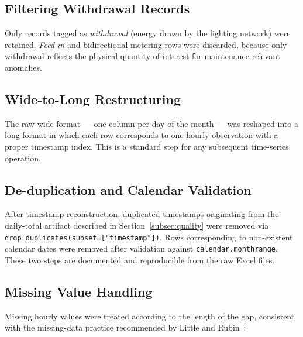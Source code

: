 \documentclass[11pt]{article}
\begin{document}
\subsection{Filtering Withdrawal Records}
Only records tagged as \emph{withdrawal} (energy drawn by the lighting network) were retained. \emph{Feed-in} and bidirectional-metering rows were discarded, because only withdrawal reflects the physical quantity of interest for maintenance-relevant anomalies.

\subsection{Wide-to-Long Restructuring}
The raw wide format --- one column per day of the month --- was reshaped into a long format in which each row corresponds to one hourly observation with a proper timestamp index. This is a standard step for any subsequent time-series operation.

\subsection{De-duplication and Calendar Validation}
After timestamp reconstruction, duplicated timestamps originating from the daily-total artifact described in Section~\ref{subsec:quality} were removed via \texttt{drop\_duplicates(subset=["timestamp"])}. Rows corresponding to non-existent calendar dates were removed after validation against \texttt{calendar.monthrange}. These two steps are documented and reproducible from the raw Excel files.

\subsection{Missing Value Handling}\label{subsec:missing}
Missing hourly values were treated according to the length of the gap, consistent with the missing-data practice recommended by Little and Rubin~\cite{littlerubin2019}:
\end{document}
